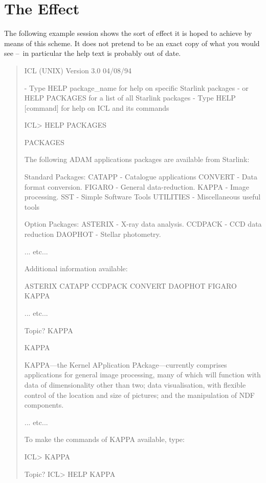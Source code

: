 \documentclass[twoside,11pt,nolof]{starlink}
\providecommand{\dash}{--}
\begin{document}
\section{The Effect}
\label{effect}
The following example session shows the sort of effect it is hoped to achieve
by means of this scheme. It does not pretend to be an exact copy of what you
would see \dash\ in particular the help text is probably out of date.
\small
\begin{quote}
\begin{terminalv}

ICL (UNIX) Version 3.0  04/08/94

  - Type HELP package_name for help on specific Starlink packages
  -   or HELP PACKAGES for a list of all Starlink packages
  - Type HELP [command] for help on ICL and its commands

ICL> HELP PACKAGES

PACKAGES

   The following ADAM applications packages are available from Starlink:

   Standard Packages:
    CATAPP    -  Catalogue applications
    CONVERT   -  Data format conversion.
    FIGARO    -  General data-reduction.
    KAPPA     -  Image processing.
    SST       -  Simple Software Tools
    UTILITIES -  Miscellaneous useful tools

   Option Packages:
    ASTERIX   -  X-ray data analysis.
    CCDPACK   -  CCD data reduction
    DAOPHOT   -  Stellar photometry.

    ... etc...

  Additional information available:

  ASTERIX    CATAPP     CCDPACK    CONVERT    DAOPHOT    FIGARO     KAPPA

    ... etc...

Topic? KAPPA

KAPPA

  KAPPA---the Kernel APplication PAckage---currently comprises applications for
  general image processing, many of which will function with data of
  dimensionality other than two; data visualisation, with flexible control of
  the location and size of pictures; and the manipulation of NDF components.

     ... etc...

  To make the commands of KAPPA available, type:

      ICL> KAPPA

Topic?
ICL> HELP KAPPA


\end{terminalv}
\end{quote}
\end{document}
